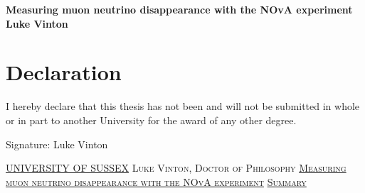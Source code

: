 \documentclass[a4paper,11pt]{report}
\newcommand{\linespacing}{1.5}
\renewcommand{\baselinestretch}{\linespacing}
\begin{document}




\thispagestyle{empty}
\begin{flushright}
\end{flushright}	
\vskip40mm
\begin{center}
\huge\textbf{Measuring muon neutrino disappearance with the NOvA experiment}
\vskip2mm
\Large\textbf{Luke Vinton}
\normalsize
\end{center}
%
%
\chapter*{Declaration}
I hereby declare that this thesis has not been and will not be submitted in whole or in part to another University for the award of any
other degree.
	

\vskip5mm
Signature:
\vskip20mm
Luke Vinton
%
%
\thispagestyle{empty}
\newpage
\null\vskip10mm
\begin{center}
\large
\underline{UNIVERSITY OF SUSSEX}
\vskip20mm
\textsc{Luke Vinton, Doctor of Philosophy}
\vskip20mm
\underline{\textsc{Measuring muon neutrino disappearance with the NOvA
    experiment}}
\vskip0mm
\vskip20mm
\underline{\textsc{Summary}}
\vskip2mm
\end{center}
\renewcommand{\baselinestretch}{1.0}
\small\normalsize
\end{document}
